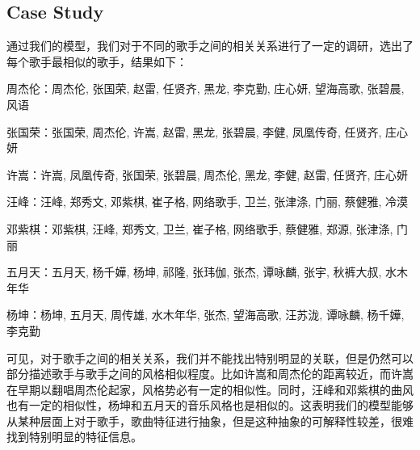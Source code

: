 \subsection{Case Study}
通过我们的模型，我们对于不同的歌手之间的相关关系进行了一定的调研，选出了每个歌手最相似的歌手，结果如下：

周杰伦：周杰伦, 张国荣, 赵雷, 任贤齐, 黑龙, 李克勤, 庄心妍, 望海高歌, 张碧晨, 风语

张国荣：张国荣, 周杰伦, 许嵩, 赵雷, 黑龙, 张碧晨, 李健, 凤凰传奇, 任贤齐, 庄心妍

许嵩：许嵩, 凤凰传奇, 张国荣, 张碧晨, 周杰伦, 黑龙, 李健, 赵雷, 任贤齐, 庄心妍

汪峰：汪峰, 郑秀文, 邓紫棋, 崔子格, 网络歌手, 卫兰, 张津涤, 门丽, 蔡健雅, 冷漠

邓紫棋：邓紫棋, 汪峰, 郑秀文, 卫兰, 崔子格, 网络歌手, 蔡健雅, 郑源, 张津涤, 门丽

五月天：五月天, 杨千嬅, 杨坤, 祁隆, 张玮伽, 张杰, 谭咏麟, 张宇, 秋裤大叔, 水木年华

杨坤：杨坤, 五月天, 周传雄, 水木年华, 张杰, 望海高歌, 汪苏泷, 谭咏麟, 杨千嬅, 李克勤

可见，对于歌手之间的相关关系，我们并不能找出特别明显的关联，但是仍然可以部分描述歌手与歌手之间的风格相似程度。比如许嵩和周杰伦的距离较近，而许嵩在早期以翻唱周杰伦起家，风格势必有一定的相似性。同时，汪峰和邓紫棋的曲风也有一定的相似性，杨坤和五月天的音乐风格也是相似的。这表明我们的模型能够从某种层面上对于歌手，歌曲特征进行抽象，但是这种抽象的可解释性较差，很难找到特别明显的特征信息。